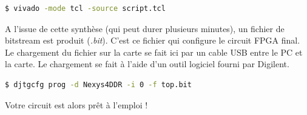 \begin{lstlisting}[language=bash]
  $ vivado -mode tcl -source script.tcl
\end{lstlisting}

A l'issue de cette synthèse (qui peut durer plusieurs minutes), un fichier de bitstream est produit ({\it .bit}). C'est ce fichier qui configure le circuit FPGA final.
Le chargement du fichier sur la carte se fait ici par un cable USB entre le PC et la carte. Le chargement se fait à l'aide d'un outil logiciel fourni par Digilent.

\begin{lstlisting}[language=bash]
  $ djtgcfg prog -d Nexys4DDR -i 0 -f top.bit
\end{lstlisting}
Votre circuit est alors prêt à l'emploi !

